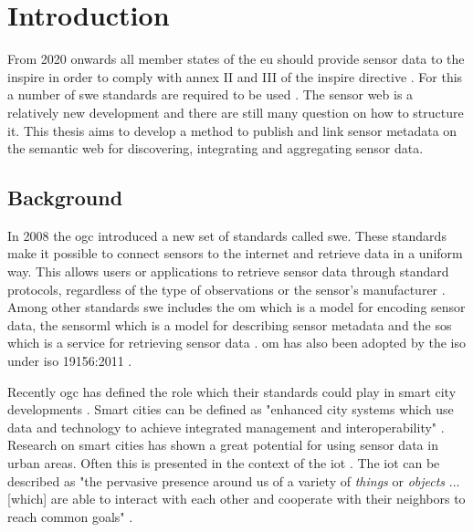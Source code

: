 
\chapter{Introduction}
\label{chap:introduction}

From 2020 onwards all member states of the \ac{eu} should provide sensor data to the \ac{inspire} in order to comply with annex II and III of the \ac{inspire} directive \citep{SDI:INSPIRE5}. For this a number of \ac{swe} standards are required to be used \citep{SDI:INSPIRE2}. The sensor web is a relatively new development and there are still many question on how to structure it. This thesis aims to develop a method to publish and link sensor metadata on the semantic web for discovering, integrating and aggregating sensor data.

\section{Background}
In 2008 the \ac{ogc} introduced a new set of standards called \ac{swe}. These standards make it possible to connect sensors to the internet and retrieve data in a uniform way. This allows users or applications to retrieve sensor data through standard protocols, regardless of the type of observations or the sensor's manufacturer \citep{SW:Botts}. Among other standards \ac{swe} includes the \ac{om} which is a model for encoding sensor data, the \ac{sensorml} which is a model for describing sensor metadata and the \ac{sos} which is a service for retrieving sensor data \citep{SW:OGC}. \ac{om} has also been adopted by the \ac{iso} under \ac{iso} 19156:2011 \citep{SW:ISO}. 

Recently \ac{ogc} has defined the role which their standards could play in smart city developments \citep{SC:OGC}. Smart cities can be defined as "enhanced city systems which use data and technology to achieve integrated management and interoperability" \citep[p. 18]{SC:Moir}. Research on smart cities has shown a great potential for using sensor data in urban areas. Often this is presented in the context of the \ac{iot} \citep{IOT:Zanelli, SSW:Wang2}. The \ac{iot} can be described as "the pervasive presence around us of a variety of \textit{things} or \textit{objects} ... [which] are able to interact with each other and cooperate with their neighbors to reach common goals" \cite[p. 2787]{IOT:Atzori}. 

